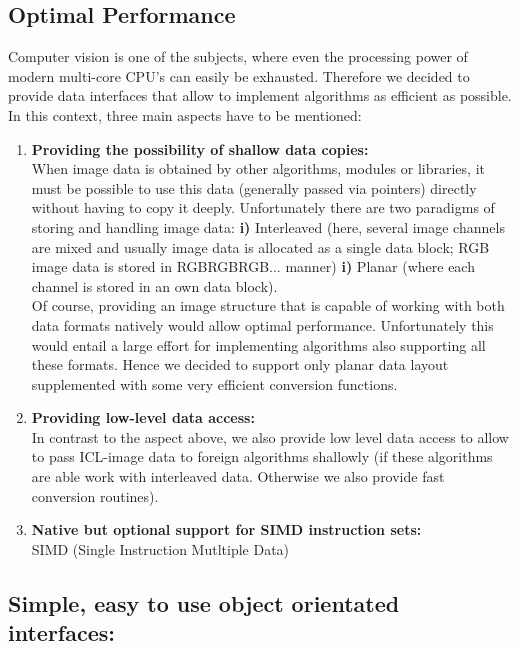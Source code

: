 \subsection{Optimal Performance} 
Computer vision is one of the subjects, where even the processing power of modern multi-core CPU's can easily be exhausted. Therefore we decided to provide data interfaces that allow to implement algorithms as efficient as possible. In this context, three main aspects have to be mentioned:
\begin{enumerate}
\item \textbf{Providing the possibility of shallow data copies:}\\
When image data is obtained by other algorithms, modules or libraries, it must be possible to use this data (generally passed via pointers) directly without having to copy it deeply. Unfortunately there are two paradigms of storing and handling image data: \small{\textbf{i)}} Interleaved (here, several image channels are mixed and usually image data is allocated as a single data block; RGB image data is stored in RGBRGBRGB... manner) \small{\textbf{i)}} Planar (where each channel is stored in an own data block).\\
Of course, providing an image structure that is capable of working with both data formats natively would allow optimal performance. Unfortunately this would entail a large effort for implementing algorithms also supporting all these formats. Hence we decided to support only planar data layout supplemented with some very efficient conversion functions.
\item \textbf{Providing low-level data access:}\\
In contrast to the aspect above, we also provide low level data access to allow to pass ICL-image data to foreign algorithms shallowly (if these algorithms are able work with interleaved data. Otherwise we also provide fast conversion routines).
\item \textbf{Native but optional support for SIMD instruction sets:}\\
SIMD (Single Instruction Mutltiple Data)
\end{enumerate}

\subsection{Simple, easy to use object orientated interfaces:}


